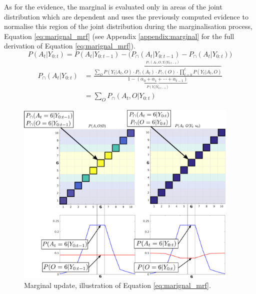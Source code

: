 As for the evidence, the marginal is evaluated only in areas of the joint distribution which are dependent and uses the previously 
computed evidence to normalise this region of the joint distribution during the marginalisation process, Equation \ref{eq:marignal_mrf}
(see Appendix \ref{appendix:marginal} for the full derivation of Equation \ref{eq:marignal_mrf}).
\begin{equation}
 P(A_t|Y_{0:t})  =  P(A_t|Y_{0:t-1}) - \Big(P_{\cap}(A_t|Y_{0:t-1}) -  P_{\cap}(A_t|Y_{0:t})  \Big) \label{eq:marignal_mrf} 
\end{equation}
\begin{align}\label{eq:marignal_mrf_2}
 P_{\cap}(A_t|Y_{0:t}) &= \frac{ \sum\limits_{O} \overbrace{P(Y_t|A_t,O) \cdot P_{\cap}(A_t)\cdot P_{\cap}(O) \cdot \prod_{t=0}^t P(Y_t|A_t,O) }^{P_{\cap}(A_t,O,Y_t|Y_{0:t-1})}}{\underbrace{1  - (\alpha_{0} + \alpha_{1} + \cdots + \alpha_{t-1})}_{P(Y_t|Y_{0:t-1})}} \\
		       &= \sum\limits_{O} P_{\cap}(A_t,O|Y_{0:t})
\end{align}


\begin{figure}
\centering
\includegraphics[width=0.95\textwidth]{./ch5-MLMF/Figures/explenation/marginal_cal_example.pdf}
\caption{Marginal update, illustration of Equation \ref{eq:marignal_mrf}. }
\end{figure}



